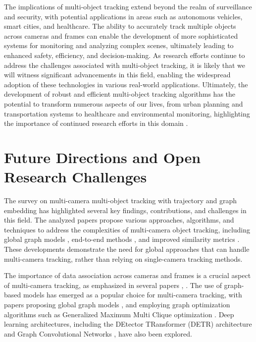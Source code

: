 \documentclass[conference]{IEEEtran}
\begin{document}
The implications of multi-object tracking extend beyond the realm of surveillance and security, with potential applications in areas such as autonomous vehicles, smart cities, and healthcare. The ability to accurately track multiple objects across cameras and frames can enable the development of more sophisticated systems for monitoring and analyzing complex scenes, ultimately leading to enhanced safety, efficiency, and decision-making. As research efforts continue to address the challenges associated with multi-object tracking, it is likely that we will witness significant advancements in this field, enabling the widespread adoption of these technologies in various real-world applications. Ultimately, the development of robust and efficient multi-object tracking algorithms has the potential to transform numerous aspects of our lives, from urban planning and transportation systems to healthcare and environmental monitoring, highlighting the importance of continued research efforts in this domain \cite{Multi-camera Multi-Object Tracking}.

\section{Future Directions and Open Research Challenges}
The survey on multi-camera multi-object tracking with trajectory and graph embedding has highlighted several key findings, contributions, and challenges in this field. The analyzed papers propose various approaches, algorithms, and techniques to address the complexities of multi-camera object tracking, including global graph models \cite{Global Graph Models for Multi-Camera Tracking}, end-to-end methods \cite{MCTR: An End-to-End Approach for Multi-Object Detection and Tracking}, and improved similarity metrics \cite{Improved Similarity Metrics for Multi-Camera Object Tracking}. These developments demonstrate the need for global approaches that can handle multi-camera tracking, rather than relying on single-camera tracking methods.

The importance of data association across cameras and frames is a crucial aspect of multi-camera tracking, as emphasized in several papers \cite{Data Association for Multi-Camera Tracking}, \cite{Multi-Camera Object Tracking using Graph-Based Models}. The use of graph-based models has emerged as a popular choice for multi-camera tracking, with papers proposing global graph models \cite{Global Graph Models for Multi-Camera Tracking}, \cite{Graph-Based Models for Multi-Camera Object Tracking} and employing graph optimization algorithms such as Generalized Maximum Multi Clique optimization \cite{Generalized Maximum Multi Clique Optimization for Multi-Camera Tracking}. Deep learning architectures, including the DEtector TRansformer (DETR) architecture \cite{MCTR: An End-to-End Approach for Multi-Object Detection and Tracking} and Graph Convolutional Networks \cite{Graph Convolutional Networks for Multi-Camera Object Tracking}, have also been explored.
\end{document}
